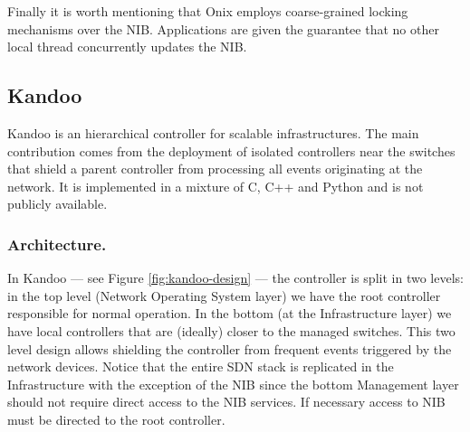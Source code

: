 \documentclass[12pt,openright,twoside]{report}
\begin{document}
\begin{itemize}
Finally it is worth mentioning that Onix employs coarse-grained
locking mechanisms over the NIB. Applications are given the guarantee
that no other local thread concurrently updates the NIB. 

\subsection{Kandoo}
Kandoo \cite{Yeganeh:2012jm} is an hierarchical controller for
scalable infrastructures. The main
contribution comes from the deployment of isolated controllers near
the switches that shield a parent  controller from processing all
events originating at the network. It is implemented in a mixture of
C, C++ and Python and is not publicly available. 

\subsubsection{Architecture.} In Kandoo --- see Figure  \ref{fig:kandoo-design} --- the controller is split in two levels: in the top level (Network Operating System layer) we
have the root controller responsible for normal operation. In the
bottom (at the Infrastructure layer) we have local controllers that are (ideally)  closer to the
managed switches. This two level design allows  shielding the
controller from frequent events triggered by 
the network devices. Notice that  the entire SDN
stack is replicated in the Infrastructure with the exception of the
NIB since the bottom Management layer should not require direct access to the NIB services. If necessary access to NIB
must be directed to the root controller.


\end{itemize}
\end{document}
